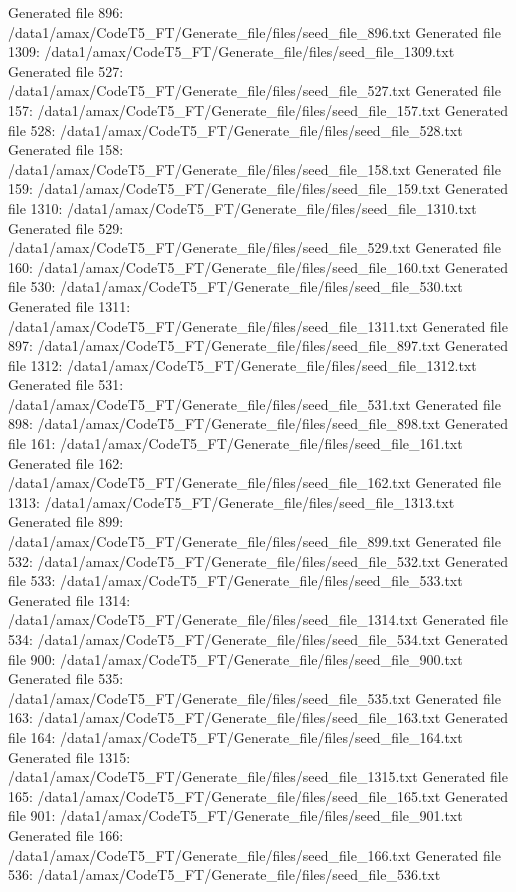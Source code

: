 Generated file 896: /data1/amax/CodeT5_FT/Generate_file/files/seed_file_896.txt
Generated file 1309: /data1/amax/CodeT5_FT/Generate_file/files/seed_file_1309.txt
Generated file 527: /data1/amax/CodeT5_FT/Generate_file/files/seed_file_527.txt
Generated file 157: /data1/amax/CodeT5_FT/Generate_file/files/seed_file_157.txt
Generated file 528: /data1/amax/CodeT5_FT/Generate_file/files/seed_file_528.txt
Generated file 158: /data1/amax/CodeT5_FT/Generate_file/files/seed_file_158.txt
Generated file 159: /data1/amax/CodeT5_FT/Generate_file/files/seed_file_159.txt
Generated file 1310: /data1/amax/CodeT5_FT/Generate_file/files/seed_file_1310.txt
Generated file 529: /data1/amax/CodeT5_FT/Generate_file/files/seed_file_529.txt
Generated file 160: /data1/amax/CodeT5_FT/Generate_file/files/seed_file_160.txt
Generated file 530: /data1/amax/CodeT5_FT/Generate_file/files/seed_file_530.txt
Generated file 1311: /data1/amax/CodeT5_FT/Generate_file/files/seed_file_1311.txt
Generated file 897: /data1/amax/CodeT5_FT/Generate_file/files/seed_file_897.txt
Generated file 1312: /data1/amax/CodeT5_FT/Generate_file/files/seed_file_1312.txt
Generated file 531: /data1/amax/CodeT5_FT/Generate_file/files/seed_file_531.txt
Generated file 898: /data1/amax/CodeT5_FT/Generate_file/files/seed_file_898.txt
Generated file 161: /data1/amax/CodeT5_FT/Generate_file/files/seed_file_161.txt
Generated file 162: /data1/amax/CodeT5_FT/Generate_file/files/seed_file_162.txt
Generated file 1313: /data1/amax/CodeT5_FT/Generate_file/files/seed_file_1313.txt
Generated file 899: /data1/amax/CodeT5_FT/Generate_file/files/seed_file_899.txt
Generated file 532: /data1/amax/CodeT5_FT/Generate_file/files/seed_file_532.txt
Generated file 533: /data1/amax/CodeT5_FT/Generate_file/files/seed_file_533.txt
Generated file 1314: /data1/amax/CodeT5_FT/Generate_file/files/seed_file_1314.txt
Generated file 534: /data1/amax/CodeT5_FT/Generate_file/files/seed_file_534.txt
Generated file 900: /data1/amax/CodeT5_FT/Generate_file/files/seed_file_900.txt
Generated file 535: /data1/amax/CodeT5_FT/Generate_file/files/seed_file_535.txt
Generated file 163: /data1/amax/CodeT5_FT/Generate_file/files/seed_file_163.txt
Generated file 164: /data1/amax/CodeT5_FT/Generate_file/files/seed_file_164.txt
Generated file 1315: /data1/amax/CodeT5_FT/Generate_file/files/seed_file_1315.txt
Generated file 165: /data1/amax/CodeT5_FT/Generate_file/files/seed_file_165.txt
Generated file 901: /data1/amax/CodeT5_FT/Generate_file/files/seed_file_901.txt
Generated file 166: /data1/amax/CodeT5_FT/Generate_file/files/seed_file_166.txt
Generated file 536: /data1/amax/CodeT5_FT/Generate_file/files/seed_file_536.txt

